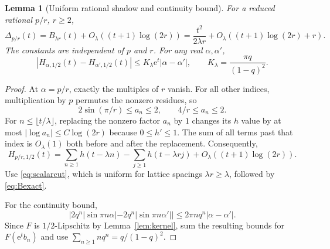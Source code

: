 \documentclass[11pt,a4paper]{article}
\newtheorem{lemma}[theorem]{Lemma}
\theoremstyle{definition}
\theoremstyle{remark}\newtheorem{remark}[theorem]{Remark}
\newcommand{\e}{\mathrm e}
\begin{document}
\begin{lemma}[Uniform rational shadow and continuity bound]
\label{lem:rationalshadow}
For a reduced rational $p/r$, $r\ge2$,
\begin{equation}
 \Delta_{p/r}(t)=B_{\lambda r}(t)
      +O_\lambda((t+1)\log(2r))
 =\frac{t^2}{2\lambda r}
      +O_\lambda((t+1)\log(2r)+r).
 \label{eq:rationalshadow}
\end{equation}
The constants are independent of $p$ and $r$.  For any real $\alpha,\alpha'$,
\begin{equation}
 |H_{\alpha,1/2}(t)-H_{\alpha',1/2}(t)|
 \le K_\lambda\e^t|\alpha-\alpha'|,
 \qquad K_\lambda=\frac{\pi q}{(1-q)^2}.
 \label{eq:continuityalpha}
\end{equation}
\end{lemma}
\begin{proof}
At $\alpha=p/r$, exactly the multiples of $r$ vanish.  For all other
indices, multiplication by $p$ permutes the nonzero residues, so
\[
 2\sin(\pi/r)\le a_n\le2,
 \qquad 4/r\le a_n\le2.
\]
For $n\le\lfloor t/\lambda\rfloor$, replacing the nonzero factor $a_n$ by
$1$ changes its $h$ value by at most $|\log a_n|\le C\log(2r)$ because
$0\le h'\le1$.  The sum of all terms past that index is $O_\lambda(1)$
both before and after the replacement.  Consequently,
\[
 H_{p/r,1/2}(t)=
   \sum_{n\ge1}h(t-\lambda n)
  -\sum_{j\ge1}h(t-\lambda rj)
  +O_\lambda((t+1)\log(2r)).
\]
Use \eqref{eq:scalarcut}, which is uniform for lattice spacings
$\lambda r\ge\lambda$, followed by \eqref{eq:Bexact}.

For the continuity bound,
\[
 |2q^n|\sin\pi n\alpha|-2q^n|\sin\pi n\alpha'||
 \le2\pi nq^n|\alpha-\alpha'|.
\]
Since $F$ is $1/2$-Lipschitz by Lemma~\ref{lem:kernel}, sum the resulting
bounds for $F(\e^t b_n)$ and use
$\sum_{n\ge1}nq^n=q/(1-q)^2$.
\end{proof}
\end{document}
